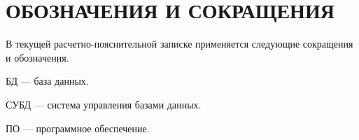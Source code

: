 \chapter*{ОБОЗНАЧЕНИЯ И СОКРАЩЕНИЯ}

В текущей расчетно-пояснительной записке применяется следующие сокращения и обозначения.

\begin{description}[leftmargin=0pt]
	\item \noindent БД --- база данных.
	\item \noindent СУБД --- система управления базами данных.
	\item \noindent ПО --- программное обеспечение.
\end{description}

